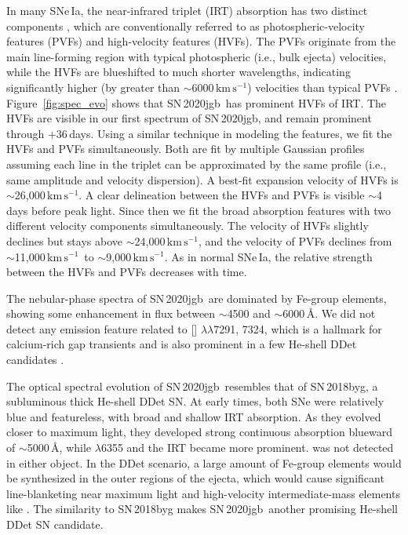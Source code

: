 \documentclass[twocolumn]{aastex631}
\newcommand{\sn}{SN\,2020jgb}
\newcommand{\kms}{$\mathrm{km}\,\mathrm{s}^{-1}$}
\newcommand{\chang}[1]{\textcolor{blue}{[Chang: #1]}}
\begin{document}
In many SNe\,Ia, the  near-infrared triplet (IRT) absorption has two distinct components \citep{Mazzali_2005}, which are conventionally referred to as photospheric-velocity features (PVFs) and high-velocity features (HVFs). The PVFs originate from the main line-forming region with typical photospheric (i.e., bulk ejecta) velocities, while the HVFs are blueshifted to much shorter wavelengths, indicating significantly higher (by greater than $\sim$6000\,\kms) velocities than typical PVFs \citep{Silverman_HVF_2015}. Figure~\ref{fig:spec_evo} shows that \sn\ has prominent HVFs of  IRT. The HVFs are visible in our first spectrum of \sn, and remain prominent through $+36$\,days. Using a similar technique in modeling the  features, we fit the HVFs and PVFs simultaneously. Both are fit by multiple Gaussian profiles assuming each line in the triplet can be approximated by the same profile (i.e., same amplitude and velocity dispersion). A best-fit expansion velocity of HVFs is $\sim$26,000\,\kms. A clear delineation between the HVFs and PVFs is visible $\sim$4\,days before peak light. Since then we fit the broad absorption features with two different velocity components simultaneously. The velocity of HVFs slightly declines but stays above $\sim$24,000\,\kms, and the velocity of PVFs declines from $\sim$11,000\,\kms\ to $\sim$9,000\,\kms. As in normal SNe\,Ia, the relative strength between the HVFs and PVFs decreases with time. %

The nebular-phase spectra of \sn\ are dominated by Fe-group elements, showing some enhancement in flux between $\sim$4500 and $\sim$6000\,\AA. We did not detect any emission feature related to [] $\lambda\lambda$7291, 7324, which is a hallmark for calcium-rich gap transients and is also prominent in a few He-shell DDet candidates \citep[e.g., SN\,2016hnk and SN\,2019ofm;][]{De_Ca-rich_2020}.

The optical spectral evolution of \sn\ resembles that of SN\,2018byg, a subluminous thick He-shell DDet SN. At early times, both SNe were relatively blue and featureless, with broad and shallow  IRT absorption. As they evolved closer to maximum light, they developed strong continuous absorption blueward of $\sim$5000\,\AA, while  $\lambda$6355 and the  IRT became more prominent.  was not detected in either object. In the DDet scenario, a large amount of Fe-group elements would be synthesized in the outer regions of the ejecta, which would cause significant line-blanketing near maximum light \citep{Kromer_DD_2010, polin_observational_2019} and high-velocity intermediate-mass elements like  \citep{Fink_DD_2010, Kromer_DD_2010,Shen_DD_2014}. The similarity to SN\,2018byg makes \sn\ another promising He-shell DDet SN candidate.
\end{document}
